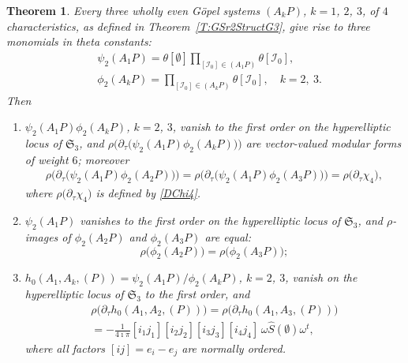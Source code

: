 \documentclass[twoside]{amsart}
\newcommand{\I}{\mathcal{I}}
\newtheorem{theo}{Theorem}[section]
\theoremstyle{definition}
\theoremstyle{plain}
\begin{document}
\begin{theo}\label{T:GSr2SplitG3}
Every three wholly even G\"{o}pel systems $(A_k P)$, $k=1$, $2$, $3$, 
of $4$ characteristics, as defined in Theorem~\ref{T:GSr2StructG3},
give rise to three monomials in theta constants:
\begin{subequations}\label{Psi2Phi2G3}
\begin{align}
&\psi_2 (A_1P) = \theta[\emptyset] \prod_{[\I_0] \in (A_1P)} \theta[\I_0],\\
&\phi_2(A_k P) = \prod_{[\I_0] \in (A_k P)} \theta[\I_0],\quad k=2,\ 3.
\end{align}
\end{subequations}
Then 
\begin{enumerate}
\renewcommand{\labelenumi}{\arabic{enumi})}


\item $\psi_2(A_1P) \phi_2(A_k P)$, $k=2$, $3$, 
vanish to the first order on the hyperelliptic locus of $\mathfrak{S}_3$, and
$\rho\big(\partial_\tau \big(\psi_2 (A_1P) \phi_2 (A_k P) \big) \big)$
are vector-valued modular forms of weight $6$; moreover
\begin{gather*}\label{DPsi2Phi2G3}
\rho\big(\partial_\tau \big(\psi_2 (A_1P) \phi_2 (A_2 P) \big) \big) = 
\rho\big(\partial_\tau \big(\psi_2 (A_1P) \phi_2 (A_3 P) \big) \big)
= \rho\big(\partial_\tau \chi_4 \big),
\end{gather*}
where $\rho\big(\partial_\tau \chi_4 \big)$ is defined by \eqref{DChi4}.

\item   $\psi_2(A_1P)$ vanishes to the first order 
on the hyperelliptic locus of $\mathfrak{S}_3$, 
and $\rho$-images of $\phi_2(A_2 P)$ and $\phi_2(A_3 P)$ are equal:
$$\rho\big(\phi_2(A_2 P)\big) = \rho \big( \phi_2(A_3 P)\big);$$

\item $h_0(A_1,A_k,(P)) = \psi_2(A_1 P)/ \phi_2(A_k P)$, $k=2$, $3$,  
vanish on the hyperelliptic locus of $\mathfrak{S}_3$
to the first order, and 
\begin{multline}\label{0Psi2Phi2G3}
\rho \big( \partial_\tau h_0(A_1,A_2,(P)) \big)  = 
\rho \big( \partial_\tau h_0(A_1,A_3,(P)) \big) \\
= - \frac{1}{4\imath \pi} [i_1 j_1] [i_2 j_2] [i_3j_3] [i_4j_4]\, \omega \hat{S}(\emptyset) \omega^t,
\end{multline}
where all factors $[ij]=e_i-e_j$ are normally ordered.
\end{enumerate}
\end{theo}
\end{document}
